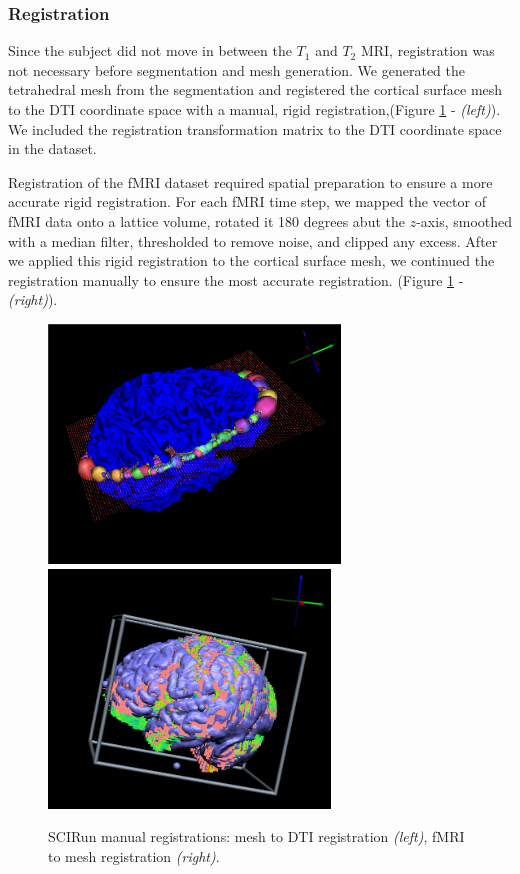 \subsubsection{Registration}
\label{sec:reg}

Since the subject did not move in between the $T_1$ and $T_2$ MRI, registration was not necessary before segmentation and mesh generation. We generated the tetrahedral mesh from the segmentation and registered the cortical surface mesh to the DTI coordinate space with a manual, rigid registration,(Figure \ref{fig:dtireg} - \textit{(left)}). We included the registration transformation matrix to the DTI coordinate space in the dataset. 

Registration of the fMRI dataset required spatial preparation to ensure a more accurate rigid registration. For each fMRI time step, we mapped the vector of fMRI data onto a lattice volume, rotated it 180 degrees abut the $z$-axis, smoothed with a median filter, thresholded to remove noise, and clipped any excess. After we applied this rigid registration to the cortical surface mesh, we continued the registration manually to ensure the most accurate registration. (Figure \ref{fig:dtireg} - \textit{(right)}). 

\begin{figure}[H]
\begin{center}
\includegraphics[height = 2.5in]{Figures/DTI_reg}
\includegraphics[height = 2.5in]{Figures/fmri_reg}
\caption{SCIRun manual registrations: mesh to DTI registration \textit{(left)}, fMRI to mesh registration \textit{(right)}.}
\label{fig:dtireg}
\end{center}
\end{figure}

